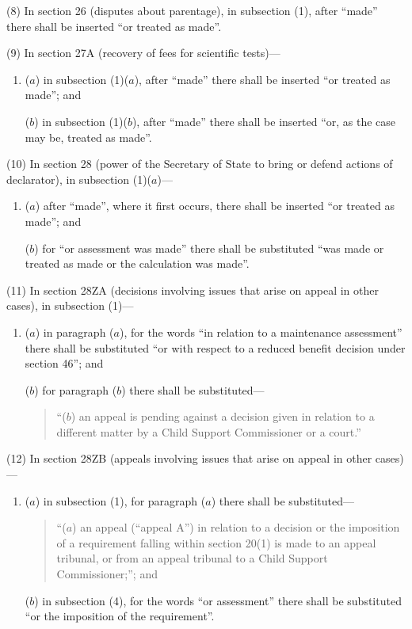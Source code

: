 \documentclass[12pt,a4paper]{article}
\begin{document}
(8) In section 26 (disputes about parentage), in subsection (1), after “made” there shall be inserted “or treated as made”.

(9) In section 27A (recovery of fees for scientific tests)—
\begin{enumerate}\item[]
($a$) in subsection (1)($a$), after “made” there shall be inserted “or treated as made”; and

($b$) in subsection (1)($b$), after “made” there shall be inserted “or, as the case may be, treated as made”.
\end{enumerate}

(10) In section 28 (power of the Secretary of State to bring or defend actions of declarator), in subsection (1)($a$)—
\begin{enumerate}\item[]
($a$) after “made”, where it first occurs, there shall be inserted “or treated as made”; and

($b$) for “or assessment was made” there shall be substituted “was made or treated as made or the calculation was made”.
\end{enumerate}

(11) In section 28ZA (decisions involving issues that arise on appeal in other cases), in subsection (1)—
\begin{enumerate}\item[]
($a$) in paragraph ($a$), for the words “in relation to a maintenance assessment” there shall be substituted “or with respect to a reduced benefit decision under section 46”; and

($b$) for paragraph ($b$)  there shall be substituted—

\begin{quotation}
“($b$) an appeal is pending against a decision given in relation to a different matter by a Child Support Commissioner or a court.”
\end{quotation}
\end{enumerate}

(12) In section 28ZB (appeals involving issues that arise on appeal in other cases)—
\begin{enumerate}\item[]
($a$) in subsection (1), for paragraph ($a$)  there shall be substituted—
\begin{quotation}
“($a$) an appeal (“appeal A”) in relation to a decision or the imposition of a requirement falling within section 20(1)  is made to an appeal tribunal, or from an appeal tribunal to a Child Support Commissioner;”; and
\end{quotation}

($b$) in subsection (4), for the words “or assessment” there shall be substituted “or the imposition of the requirement”.
\end{enumerate}
\end{document}
